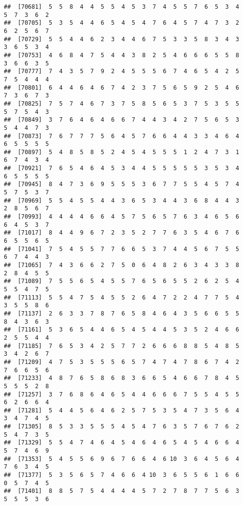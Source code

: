 \documentclass[
]{book}
\begin{document}
\begin{verbatim}
##  [70681]  5  5  8  4  4  5  5  4  5  3  7  4  5  5  7  6  5  3  4  5  7  3  6  2
##  [70705]  5  3  5  4  4  6  5  4  5  4  7  6  4  5  7  4  7  3  2  6  2  5  6  7
##  [70729]  5  5  4  4  6  2  3  4  4  6  7  5  3  3  5  8  3  4  3  3  6  5  3  4
##  [70753]  4  6  8  4  7  5  4  4  3  8  2  5  4  6  6  6  5  5  8  3  6  6  3  5
##  [70777]  7  4  3  5  7  9  2  4  5  5  5  6  7  4  6  5  4  2  5  7  5  4  4  4
##  [70801]  6  4  4  6  4  6  7  4  2  3  7  5  6  5  9  2  5  4  6  7  3  6  7  3
##  [70825]  7  5  7  4  6  7  3  7  5  8  5  6  5  3  7  5  3  5  5  5  7  5  4  3
##  [70849]  3  7  6  4  6  4  6  6  7  4  4  3  4  2  7  5  6  5  3  5  4  4  7  3
##  [70873]  7  6  7  7  7  5  6  4  5  7  6  6  4  4  3  3  4  6  4  6  5  5  5  5
##  [70897]  5  4  8  5  8  5  2  4  5  4  5  5  5  1  2  4  7  3  1  6  7  4  3  4
##  [70921]  7  6  5  4  6  4  5  3  4  4  5  5  5  5  5  3  5  3  4  6  5  5  5  5
##  [70945]  8  4  7  3  6  9  5  5  5  3  6  7  7  5  5  4  5  7  4  5  7  5  3  7
##  [70969]  5  5  4  5  5  4  4  3  6  5  3  4  4  3  6  8  4  4  3  2  8  5  6  7
##  [70993]  4  4  4  4  6  6  4  5  7  5  6  5  7  6  3  4  6  5  6  6  4  5  3  7
##  [71017]  8  4  4  9  6  7  2  3  5  2  7  7  6  3  5  4  6  7  6  6  5  5  6  5
##  [71041]  7  5  4  5  5  7  7  6  6  5  3  7  4  4  5  6  7  5  5  6  7  4  4  3
##  [71065]  7  4  3  6  6  2  7  5  0  6  4  8  2  6  3  4  3  3  8  2  8  4  5  5
##  [71089]  7  5  5  6  5  4  5  5  7  6  5  6  5  5  2  6  2  5  4  5  5  4  7  5
##  [71113]  5  5  4  7  5  4  5  5  2  6  4  7  2  2  4  7  7  5  4  3  5  5  8  6
##  [71137]  2  6  3  3  7  8  7  6  5  8  4  6  4  3  5  6  6  5  5  8  4  3  6  3
##  [71161]  5  3  6  5  4  4  6  5  4  5  4  4  5  3  5  2  4  6  6  2  5  5  4  4
##  [71185]  7  6  5  3  4  2  5  7  7  2  6  6  6  8  8  5  4  8  5  3  4  2  6  7
##  [71209]  4  7  5  3  5  5  5  6  5  7  4  7  4  7  8  6  7  4  2  7  6  6  5  6
##  [71233]  4  8  7  6  5  8  6  8  3  6  6  5  4  6  6  7  8  4  5  5  5  5  2  8
##  [71257]  3  7  6  8  6  4  6  5  4  4  6  6  6  7  5  5  4  5  5  6  2  6  6  4
##  [71281]  5  4  4  5  6  4  6  2  5  7  5  3  5  4  7  3  5  6  4  3  4  7  4  5
##  [71305]  8  5  3  3  5  5  5  4  5  4  7  6  3  5  7  6  7  6  2  5  4  7  3  5
##  [71329]  5  5  4  7  4  6  4  5  4  6  4  6  5  4  5  4  6  6  4  5  7  4  6  9
##  [71353]  5  4  5  5  6  9  6  7  6  6  4  6 10  3  6  4  5  6  4  7  6  3  4  5
##  [71377]  5  3  5  6  5  7  4  6  6  4 10  3  6  5  5  6  1  6  6  0  5  7  4  5
##  [71401]  8  8  5  7  5  4  4  4  4  5  7  2  7  8  7  7  5  6  3  5  5  5  3  6

\end{verbatim}
\end{document}
